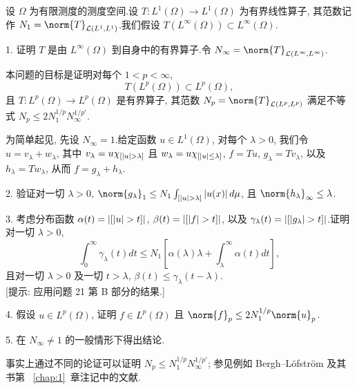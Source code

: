 \begin{problem}
\label{prob:22}
设 $\Omega$ 为有限测度的测度空间.设 $T:L^1(\Omega)\to L^1(\Omega)$ 为有界线性算子,
其范数记作 $N_1=\norm{T}_{\LL(L^1,L^1)}$.我们假设 $T(L^\infty(\Omega))\subset L^\infty(\Omega)$.

1. 证明 $T$ 是由 $L^\infty(\Omega)$ 到自身中的有界算子.令 $N_\infty=\norm{T}_{\LL(L^\infty,L^\infty)}$.

本问题的目标是证明对每个 $1<p<\infty$,
\begin{equation*}
T(L^p(\Omega))\subset L^p(\Omega),
\end{equation*}
且 $T:L^p(\Omega)\to L^p(\Omega)$ 是有界算子, 其范数 $N_p=\norm{T}_{\LL(L^p,L^p)}$
满足不等式 $N_p\le2N_1^{1/p}N_\infty^{1/p'}$.

为简单起见, 先设 $N_\infty=1$.给定函数 $u\in L^1(\Omega)$, 对每个 $\lambda>0$, 我们令
$u=v_\lambda+w_\lambda$, 其中 $v_\lambda=u\chi_{[\abs{u}>\lambda]}$ 且
$w_\lambda=u\chi_{[\left|u\right|\le\lambda]}$, $f=Tu$, $g_\lambda=Tv_\lambda$, 以及
$h_\lambda=Tw_\lambda$, 从而 $f=g_\lambda+h_\lambda$.

2. 验证对一切 $\lambda>0$, $\norm{g_\lambda}_1\le N_1\int_{[\abs{u}>\lambda]}\abs{u(x)}d\mu$,
且 $\norm{h_\lambda}_\infty\le\lambda$.

3. 考虑分布函数 $\alpha(t)=\abs{[\abs{u}>t]}$, $\beta(t)=\abs{[\abs{f}>t]}$, 以及
$\gamma_\lambda(t)=\abs{[\abs{g_\lambda}>t]}$.证明对一切 $\lambda>0$,
\begin{equation*}
\int_0^\infty\gamma_\lambda(t)dt\le N_1\left[\alpha(\lambda)\lambda+\int_\lambda^\infty\alpha(t)dt\right],
\end{equation*}
且对一切 $\lambda>0$ 及一切 $t>\lambda$, $\beta(t)\le\gamma_\lambda(t-\lambda)$.\\
{[提示: 应用问题 21 第 B 部分的结果.]}

4. 假设 $u\in L^p(\Omega)$, 证明 $f\in L^p(\Omega)$ 且 $\norm{f}_p\le2N_1^{1/p}\norm{u}_p$.

5. 在 $N_\infty\ne1$ 的一般情形下得出结论.

 事实上通过不同的论证可以证明 $N_p\le N_1^{1/p}N_\infty^{1/p'}$;
参见例如 Bergh--Löfström  及其书第~
\ref{chap:1}~章注记中的文献.
\end{problem}

